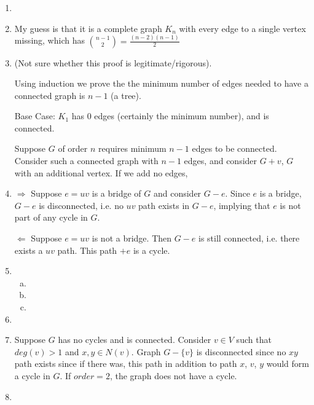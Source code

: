 \documentclass[11pt]{article}
\begin{document}
\begin{enumerate}[1]
    \item %
        

    \item %
        My guess is that it is a complete graph $K_n$ with every edge to a single 
        vertex missing, which has $\binom{n-1}{2} = \frac{(n-2)(n-1)}{2}$

    \item %
        (Not sure whether this proof is legitimate/rigorous).

        Using induction we prove the the minimum number of edges needed to have 
        a connected graph is $n - 1$ (a tree). 

        Base Case: $K_1$ has $0$ edges (certainly the minimum number), and is connected.

        Suppose $G$ of order $n$ requires minimum ${n - 1}$ edges to be connected.
        Consider such a connected graph with $n - 1$ edges, and consider $G + {v}$,
        $G$ with an additional vertex. If we add no edges, 

    \item %
        $\Rightarrow$ Suppose $e = uv$ is a bridge of $G$ and consider $G-e$. Since
        $e$ is a bridge, $G-e$ is disconnected, i.e. no $uv$ path exists in $G-e$,
        implying that $e$ is not part of any cycle in $G$. 


        $\Leftarrow$ Suppose $e = uv$ is not a bridge. Then $G - e$ is still connected, 
        i.e. there exists a $uv$ path. This path $+ e$ is a cycle.

    \item %
        \begin{enumerate}[a)]
            \item 
            \item 
            \item
        \end{enumerate}

    \item %
        

    \item %
        Suppose $G$ has no cycles and is connected. Consider $v \in V$ such that 
        $deg(v) > 1$ and $x,y \in N(v)$. Graph $G - \{v\}$ is disconnected since 
        no $xy$ path exists since if there was, this path in addition to 
        path $x$, $v$, $y$ would form a cycle in $G$. If $order = 2$, the graph does 
        not have a cycle. 
    \item %


\end{enumerate}
\end{document}
